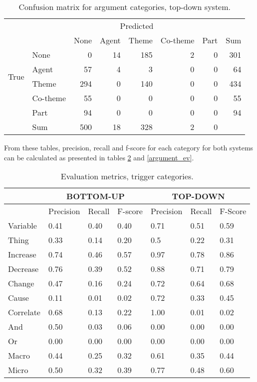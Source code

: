 \begin{table}
\begin{center}
\begin{tabular}{ | l | l | r | r | r | r | r | r | }
	\hline
	\multirow{8}{*}{True} & \multicolumn{7}{c|}{Predicted} \\ \cline{1-8}
	&\cellcolor{gray} & None & Agent & Theme & Co-theme & Part & Sum \\ \cline{2-8}
	&None & \cellcolor{g} 0 & 14 & 185 & 2 & 0 &  301 \\
	&Agent & 57 & \cellcolor{g} 4 & 3 & 0 & 0 & 64 \\
	&Theme & 294 & 0 & \cellcolor{g} 140 & 0 & 0 & 434 \\
	&Co-theme & 55 & 0 & 0 & \cellcolor{g} 0 & 0 & 55 \\
	&Part & 94 & 0 & 0 & 0 & \cellcolor{g} 0 & 94 \\ \hline	
	& Sum & 500 & 18 & 328 & 2 & 0 & \\ \hline
\end{tabular}
\end{center}
\caption{Confusion matrix for argument categories, top-down system.}
\label{pms_argument_conf}
\end{table}
\fi

From these tables, precision, recall and f-score for each category for both systems can be calculated as presented in tables \ref{trigger_ev} and \ref{argument_ev}. 

\begin{table}
\begin{center}
\begin{tabular}{ | l | l | l | l | l | l | l | }
	\hline
	\cellcolor{gray} & \multicolumn{3}{c}{BOTTOM-UP} & \multicolumn{3}{c|}{TOP-DOWN} \\ \hline
	\cellcolor{gray} & Precision & Recall & F-score & Precision & Recall & F-Score \\ \hline
	Variable & 0.41 & 0.40 & 0.40 & 0.71 & 0.51 & 0.59 \\
	Thing & 0.33 & 0.14 & 0.20 & 0.5 & 0.22 & 0.31 \\
	Increase & 0.74 & 0.46 & 0.57 & 0.97 & 0.78 & 0.86 \\
	Decrease & 0.76 & 0.39 & 0.52 & 0.88 & 0.71 & 0.79 \\ 
	Change & 0.47 & 0.16 & 0.24 & 0.72 & 0.64 & 0.68 \\ 
	Cause & 0.11 & 0.01 & 0.02 & 0.72 & 0.33 & 0.45 \\ 
	Correlate & 0.68 & 0.13 & 0.22 & 1.00 & 0.01 & 0.02 \\ 
	And & 0.50 & 0.03 & 0.06 & 0.00 & 0.00 & 0.00 \\
	Or & 0.00 & 0.00 & 0.00 & 0.00 & 0.00 & 0.00 \\ \hline
	Macro & 0.44 & 0.25 & 0.32 & 0.61 & 0.35 & 0.44 \\
	Micro & 0.50 & 0.32 & 0.39 & 0.77 & 0.48 & 0.60 \\ \hline
\end{tabular}
\end{center}
\caption{Evaluation metrics, trigger categories.}
\label{trigger_ev}
\end{table}


